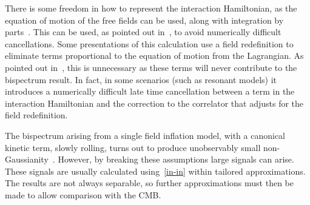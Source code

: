 \documentclass[a4paper,12pt]{extarticle}
\begin{document}
There is some freedom in how to represent the interaction Hamiltonian,
as the equation of motion of the free fields can be used, along with integration by parts~\cite{rp_integ_by_parts}.
This can be used, as pointed out in~\cite{Funakoshi}, to avoid numerically difficult cancellations.
Some presentations of this calculation use a field redefinition to eliminate terms
proportional to the equation of motion from the Lagrangian.
As pointed out in~\cite{px_burrage},
this is unnecessary as these terms will never contribute to the bispectrum result.
In fact, in some scenarios (such as resonant models) it introduces a numerically difficult
late time cancellation between a term in the interaction Hamiltonian and the
correction to the correlator that adjusts for the field redefinition.


The bispectrum arising from a single field inflation model,
with a canonical kinetic term, slowly rolling, turns out to produce
unobservably small non-Gaussianity~\cite{Maldacena}.
However, by breaking these assumptions large signals can arise.
These signals are usually calculated using~\eqref{in-in} within tailored approximations.
The results are not always separable, so further approximations must then be made to
allow comparison with the CMB.
\end{document}
